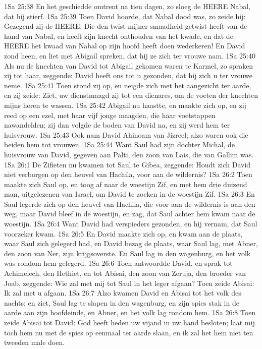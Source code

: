 1Sa 25:38  En het geschiedde omtrent na tien dagen, zo sloeg de HEERE Nabal, dat hij stierf.
1Sa 25:39  Toen David hoorde, dat Nabal dood was, zo zeide hij: Gezegend zij de HEERE, Die den twist mijner smaadheid getwist heeft van de hand van Nabal, en heeft zijn knecht onthouden van het kwade, en dat de HEERE het kwaad van Nabal op zijn hoofd heeft doen wederkeren! En David zond heen, en liet met Abigail spreken, dat hij ze zich ter vrouwe nam.
1Sa 25:40  Als nu de knechten van David tot Abigail gekomen waren te Karmel, zo spraken zij tot haar, zeggende: David heeft ons tot u gezonden, dat hij zich u ter vrouwe neme.
1Sa 25:41  Toen stond zij op, en neigde zich met het aangezicht ter aarde, en zij zeide: Ziet, uw dienstmaagd zij tot een dienares, om de voeten der knechten mijns heren te wassen.
1Sa 25:42  Abigail nu haastte, en maakte zich op, en zij reed op een ezel, met haar vijf jonge maagden, die haar voetstappen nawandelden; zij dan volgde de boden van David na, en zij werd hem ter huisvrouw.
1Sa 25:43  Ook nam David Ahinoam van Jizreel; alzo waren ook die beiden hem tot vrouwen.
1Sa 25:44  Want Saul had zijn dochter Michal, de huisvrouw van David, gegeven aan Palti, den zoon van Lais, die van Gallim was.
1Sa 26:1  De Zifieten nu kwamen tot Saul te Gibea, zeggende: Houdt zich David niet verborgen op den heuvel van Hachila, voor aan de wildernis?
1Sa 26:2  Toen maakte zich Saul op, en toog af naar de woestijn Zif, en met hem drie duizend man, uitgelezenen van Israel, om David te zoeken in de woestijn Zif.
1Sa 26:3  En Saul legerde zich op den heuvel van Hachila, die voor aan de wildernis is aan den weg, maar David bleef in de woestijn, en zag, dat Saul achter hem kwam naar de woestijn.
1Sa 26:4  Want David had verspieders gezonden, en hij vernam, dat Saul voorzeker kwam.
1Sa 26:5  En David maakte zich op, en kwam aan de plaats, waar Saul zich gelegerd had, en David bezag de plaats, waar Saul lag, met Abner, den zoon van Ner, zijn krijgsoverste. En Saul lag in den wagenburg, en het volk was rondom hem gelegerd.
1Sa 26:6  Toen antwoordde David, en sprak tot Achimelech, den Hethiet, en tot Abisai, den zoon van Zeruja, den broeder van Joab, zeggende: Wie zal met mij tot Saul in het leger afgaan? Toen zeide Abisai: Ik zal met u afgaan.
1Sa 26:7  Alzo kwamen David en Abisai tot het volk des nachts; en ziet, Saul lag te slapen in den wagenburg, en zijn spies stak in de aarde aan zijn hoofdeinde, en Abner, en het volk lag rondom hem.
1Sa 26:8  Toen zeide Abisai tot David: God heeft heden uw vijand in uw hand besloten; laat mij toch hem nu met de spies op eenmaal ter aarde slaan, en ik zal het hem niet ten tweeden male doen.

